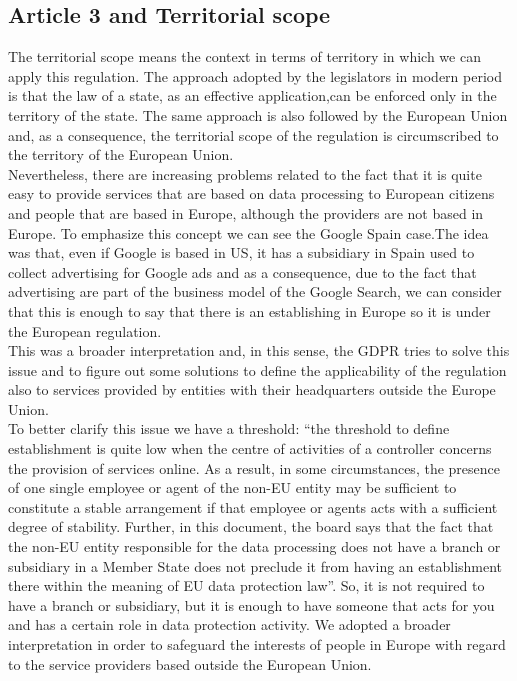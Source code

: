 \subsection{Article 3 and Territorial scope}
The territorial scope means the context in terms of territory in which we can apply this regulation. The approach adopted by the legislators in modern period is that the law of a state, as an effective application,can be enforced only in the territory of the state. The same approach is also followed by the European Union and, as a consequence, the territorial scope of the regulation is circumscribed to the territory of the European Union.\\
Nevertheless, there are increasing problems related to the fact that it is quite easy to provide services that are based on data processing to European citizens and people that are based in Europe, although the providers are not based in Europe. To emphasize this concept we can see the Google Spain case.The idea was that, even if Google is based in US, it has a subsidiary in Spain used to collect advertising for Google ads and as a consequence, due to the fact that advertising are part of the business model of the Google Search, we can consider that this is enough to say that there is an establishing in Europe so it is under the European regulation.\\
This was a broader interpretation and, in this sense, the GDPR tries to solve this issue and to figure out some solutions to define the applicability of the regulation also to services provided by entities with their headquarters outside the Europe Union.\\
To better clarify this issue we have a threshold: “the threshold to define establishment is quite low when the centre of activities of a controller concerns the provision of services online. As a result, in some circumstances, the presence of one single employee or agent of the non-EU entity may be sufficient to constitute a stable arrangement if that employee or agents acts with a sufficient degree of stability. Further, in this document, the board says that the fact that the non-EU entity responsible for the data processing does not have a branch or subsidiary in a Member State does not preclude it from having an establishment there within the meaning of EU data protection law”. So, it is not required to have a branch or subsidiary, but it is enough to have someone that acts for you and has a certain role in data protection activity. We adopted a broader interpretation in order to safeguard the interests of people in Europe with regard to the service providers based outside the European Union.\\
